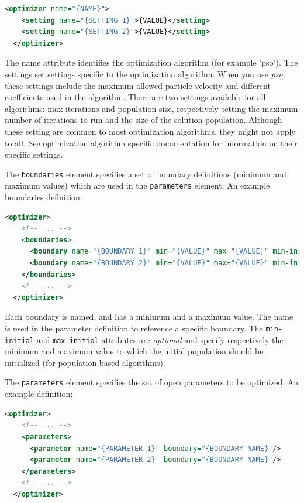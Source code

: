 \documentclass{report}
\begin{document}
\begin{lstlisting}[language=xml]
  <optimizer name="{NAME}">
    <setting name="{SETTING 1}">{VALUE}</setting>
    <setting name="{SETTING 2}">{VALUE}</setting>
  </optimizer>
\end{lstlisting}

The name attribute identifies the optimization algorithm (for example 'pso').
The settings set settings specific to the optimization algorithm. When you use
\textit{pso}, these settings include the maximum allowed particle velocity
and different coefficients used in the algorithm. There are two settings
available for all algorithms: max-iterations and population-size, respectively
setting the maximum number of iterations to run and the size of the solution
population. Although these setting are common to most optimization algorithms,
they might not apply to all. See optimization algorithm specific documentation
for information on their specific settings.

The \verb!boundaries! element specifies a set of boundary definitions (minimum
and maximum values) which are used in the \verb!parameters! element. An example
boundaries definition:

\begin{lstlisting}[language=xml]
  <optimizer>
    <!-- ... -->
    <boundaries>
      <boundary name="{BOUNDARY 1}" min="{VALUE}" max="{VALUE}" min-initial="{VALUE}" max-initial="{VALUE}"/>
      <boundary name="{BOUNDARY 2}" min="{VALUE}" max="{VALUE}" min-initial="{VALUE}" max-initial="{VALUE}"/>
    </boundaries>
    <!-- ... -->
  </optimizer>
\end{lstlisting}

Each boundary is named, and has a minimum and a maximum value. The name is
used in the parameter definition to reference a specific boundary. The
\verb!min-initial! and \verb!max-initial! attributes are \textit{optional} and
specify respectively the minimum and maximum value to which the initial
population should be initialized (for population based algorithms).

The \verb!parameters! element specifies the set of open parameters to be
optimized. An example definition:

\begin{lstlisting}[language=xml]
  <optimizer>
    <!-- ... -->
    <parameters>
      <parameter name="{PARAMETER 1}" boundary="{BOUNDARY NAME}"/>
      <parameter name="{PARAMETER 2}" boundary="{BOUNDARY NAME}"/>
    </parameters>
    <!-- ... -->
  </optimizer>
\end{lstlisting}
\end{document}
